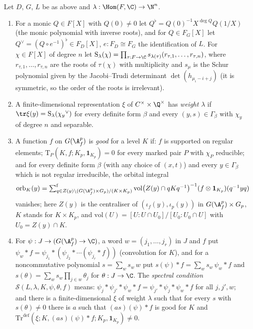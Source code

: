 \begin{definition}\label{pf:ks1:def-spec}
Let $D$, $G$, $L$ be as above and $\lambda:\Hom(F,\C)\to\N^n$.
\begin{enumerate}
\item For a monic $Q\in F[X]$ with $Q(0)\neq0$ let $Q^\flat=Q(0)^{-1}X^{\deg Q}Q(1/X)$ (the monic polynomial with inverse
  roots), and for $Q\in F_G[X]$ let ${Q}^\vee=(Q\circ e^{-1})^\flat\in F_D[X]$, $e:F_D\cong F_G$ the identification
  of $L$. For $\chi\in F[X]$ of degree $n$ let
  $\mathrm{S}_\lambda(\chi)=\prod_{\tau:F\to\C}s_{\lambda(\tau)}(r_{\tau,1},\dots,r_{\tau,n})$, where
  $r_{\tau,1},\dots,r_{\tau,n}$ are the roots of $\tau(\chi)$ with multiplicity and $s_\mu$ is the Schur polynomial given by
  the Jacobi--Trudi determinant $\det(h_{\mu_i-i+j})$ (it is symmetric, so the order of the roots is irrelevant).
\item A finite-dimensional representation $\xi$ of $C^\times\times\Q^\times$ has \emph{weight $\lambda$} if
  $\tr\xi(y)=\mathrm{S}_\lambda({\chi_y}^\vee)$ for every definite form $\beta$ and every $(y,s)\in\Gamma_\beta$
  with $\chi_y$ of degree $n$ and separable.
\item A function $f$ on $G(\ksoneAfp)$ is \emph{good} for a level $K$ if: $f$ is supported on regular elements;
  $\mathrm T_P(K,f;K_p,\mathbf 1_{K_p})=0$ for every marked pair $P$ with $\chi_P$ reducible; and for every definite form $\beta$
  (with any choice of $(x,t)$) and every $y\in\Gamma_\beta$ which is not regular irreducible, the orbital integral
  \[\mathrm{orb}_K(y)=\ksonefs_{q\in Z(y)\backslash(G(\ksoneAfp)\times G_p)/(K\times K_p)}\mathrm{vol}\bigl(Z(y)\cap qKq^{-1}\bigr)^{-1}
  (f\otimes\mathbf 1_{K_p})(q^{-1}yq)\]
  vanishes; here $Z(y)$ is the centraliser of $(\iota_f(y),\iota_p(y))$ in $G(\ksoneAfp)\times G_p$, $K$ stands for
  $K\times K_p$, and $\mathrm{vol}(U)=[U:U\cap U_0]/[U_0:U_0\cap U]$ with $U_0=Z(y)\cap K$.
\item For $\psi:J\to(G(\ksoneAfp)\to\C)$, a word $w=(j_1,\dots,j_r)$ in $J$ and $f$ put
  $\psi_w*f=\psi_{j_1}*(\psi_{j_2}*\cdots(\psi_{j_r}*f))$ (convolution for $K$), and for a noncommutative polynomial
  $s=\sum_ws_w\,w$ put $s(\psi)*f=\sum_ws_w\,\psi_w*f$ and $s(\theta)=\sum_ws_w\prod_{j\in w}\theta_j$ for $\theta:J\to\C$.
  The \emph{spectral condition} $\mathcal S(L,\lambda,K,\psi,\theta,f)$ means: $\psi_j*\psi_{j'}*\psi_w*f=\psi_{j'}*\psi_j*\psi_w*f$ for all $j,j',w$; and
  there is a finite-dimensional $\xi$ of weight $\lambda$ such that for every $s$ with $s(\theta)\neq0$ there is $a$ such that
  $(as)(\psi)*f$ is good for $K$ and $\mathrm{Tr}^{\mathrm{def}}(\xi;K,(as)(\psi)*f;K_p,\mathbf 1_{K_p})\neq0$.
\end{enumerate}
\end{definition}

